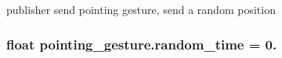 publisher send pointing gesture, send a random position 

\subsubsection[{\texorpdfstring{random\+\_\+time}{random_time}}]{\setlength{\rightskip}{0pt plus 5cm}float pointing\+\_\+gesture.\+random\+\_\+time = 0.}\hypertarget{namespacepointing__gesture_a5368d56de06c11e03076a319bb31d276}{}\label{namespacepointing__gesture_a5368d56de06c11e03076a319bb31d276}
